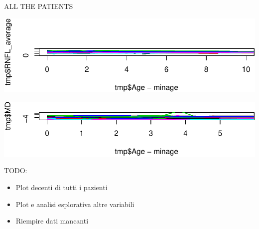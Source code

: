 \documentclass[ignorenonframetext,]{beamer}
\providecommand{\tightlist}{%
  \setlength{\itemsep}{0pt}\setlength{\parskip}{0pt}}
\begin{document}
\begin{frame}{ALL THE PATIENTS}

\includegraphics{analisi_exp_markdown_files/figure-beamer/unnamed-chunk-15-1.pdf}

\includegraphics{analisi_exp_markdown_files/figure-beamer/unnamed-chunk-16-1.pdf}

\end{frame}

\begin{frame}{TODO:}

\begin{itemize}
\tightlist
\item
  Plot decenti di tutti i pazienti
\item
  Plot e analisi esplorativa altre variabili
\item
  Riempire dati mancanti
\end{itemize}

\end{frame}
\end{document}
